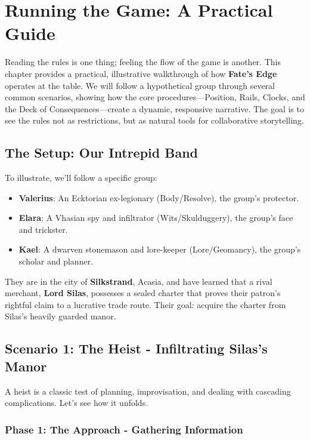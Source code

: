 \chapter{Running the Game: A Practical Guide}

Reading the rules is one thing; feeling the flow of the game is another. This chapter provides a practical, illustrative walkthrough of how \textbf{Fate's Edge} operates at the table. We will follow a hypothetical group through several common scenarios, showing how the core procedures—Position, Rails, Clocks, and the Deck of Consequences—create a dynamic, responsive narrative. The goal is to see the rules not as restrictions, but as natural tools for collaborative storytelling.

\section*{The Setup: Our Intrepid Band}

To illustrate, we'll follow a specific group:
\begin{itemize}
    \item \textbf{Valerius}: An Ecktorian ex-legionary (Body/Resolve), the group's protector.
    \item \textbf{Elara}: A Vhasian spy and infiltrator (Wits/Skulduggery), the group's face and trickster.
    \item \textbf{Kael}: A dwarven stonemason and lore-keeper (Lore/Geomancy), the group's scholar and planner.
\end{itemize}

They are in the city of \textbf{Silkstrand}, Acasia, and have learned that a rival merchant, \textbf{Lord Silas}, possesses a sealed charter that proves their patron's rightful claim to a lucrative trade route. Their goal: acquire the charter from Silas's heavily guarded manor.

\section*{Scenario 1: The Heist - Infiltrating Silas's Manor}

A heist is a classic test of planning, improvisation, and dealing with cascading complications. Let's see how it unfolds.

\subsection*{Phase 1: The Approach - Gathering Information}

